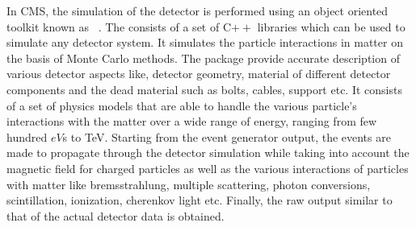 In CMS, the simulation of the detector is performed using an object oriented toolkit known as \geant~\cite{Agostinelli:2002hh}.
The \geant consists of a set of C$++$ libraries
which can be used to simulate any detector system. It simulates the particle interactions in matter on the basis of Monte Carlo methods. 
The \geant package provide accurate description of various detector aspects like, detector geometry, material of different detector components and the
dead material such as bolts, cables, support etc. It consists of a set of physics models that are able to handle the various particle's interactions with
the matter over a wide range of energy, ranging from few hundred $\unit{eV}$s to \unit{TeV}. Starting from the event generator output, the events are made
to propagate through the detector simulation while taking into account the magnetic field for charged particles as well as the various interactions of
particles with matter like bremsstrahlung, multiple scattering, photon conversions, scintillation, ionization, cherenkov light etc.
Finally, the raw output similar to that of the actual detector data is obtained. 

